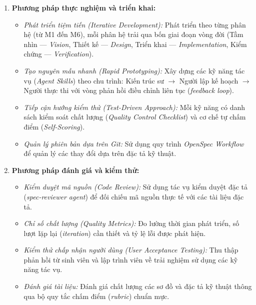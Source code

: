 \documentclass[13pt,a4paper,oneside]{extreport}
\numberwithin{equation}{chapter}
\numberwithin{figure}{chapter}
\numberwithin{table}{chapter}
\begin{document}
\begin{enumerate}
    \item \textbf{Phương pháp thực nghiệm và triển khai:}
    \begin{itemize}
        \item \textit{Phát triển tiệm tiến (\textit{Iterative Development}):} Phát triển theo từng phân hệ (từ M1 đến M6), mỗi phân hệ trải qua bốn giai đoạn vòng đời (Tầm nhìn — \textit{Vision}, Thiết kế — \textit{Design}, Triển khai — \textit{Implementation}, Kiểm chứng — \textit{Verification}).
        \item \textit{Tạo nguyên mẫu nhanh (\textit{Rapid Prototyping}):} Xây dựng các kỹ năng tác vụ (\textit{Agent Skills}) theo chu trình: Kiến trúc sư $\rightarrow$ Người lập kế hoạch $\rightarrow$ Người thực thi với vòng phản hồi điều chỉnh liên tục (\textit{feedback loop}).
        \item \textit{Tiếp cận hướng kiểm thử (\textit{Test-Driven Approach}):} Mỗi kỹ năng có danh sách kiểm soát chất lượng (\textit{Quality Control Checklist}) và cơ chế tự chấm điểm (\textit{Self-Scoring}).
        \item \textit{Quản lý phiên bản dựa trên Git:} Sử dụng quy trình \textit{OpenSpec Workflow} để quản lý các thay đổi dựa trên đặc tả kỹ thuật.
    \end{itemize}

    \item \textbf{Phương pháp đánh giá và kiểm thử:}
    \begin{itemize}
        \item \textit{Kiểm duyệt mã nguồn (\textit{Code Review}):} Sử dụng tác vụ kiểm duyệt đặc tả (\textit{spec-reviewer agent}) để đối chiếu mã nguồn thực tế với các tài liệu đặc tả.
        \item \textit{Chỉ số chất lượng (\textit{Quality Metrics}):} Đo lường thời gian phát triển, số lượt lặp lại (\textit{iteration}) cần thiết và tỷ lệ lỗi được phát hiện.
        \item \textit{Kiểm thử chấp nhận người dùng (\textit{User Acceptance Testing}):} Thu thập phản hồi từ sinh viên và lập trình viên về trải nghiệm sử dụng các kỹ năng tác vụ.
        \item \textit{Đánh giá tài liệu:} Đánh giá chất lượng các sơ đồ và đặc tả kỹ thuật thông qua bộ quy tắc chấm điểm (\textit{rubric}) chuẩn mực.
    \end{itemize}


\end{enumerate}
\end{document}
